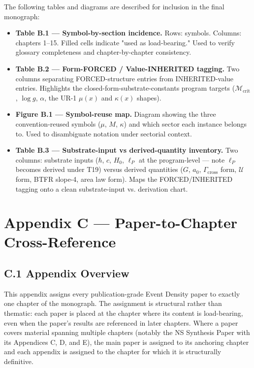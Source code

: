 \documentclass[11pt]{book}
\begin{document}
The following tables and diagrams are described for inclusion in the final monograph:

\begin{itemize}
\item \textbf{Table B.1 — Symbol-by-section incidence.} Rows: symbols. Columns: chapters 1–15. Filled cells indicate "used as load-bearing." Used to verify glossary completeness and chapter-by-chapter consistency.
\item \textbf{Table B.2 — Form-FORCED / Value-INHERITED tagging.} Two columns separating FORCED-structure entries from INHERITED-value entries. Highlights the closed-form-substrate-constants program targets ($\mathcal{M}_\mathrm{crit}$, $\log g$, $\alpha$, the UR-1 $\mu(x)$ and $\kappa(x)$ shapes).
\item \textbf{Figure B.1 — Symbol-reuse map.} Diagram showing the three convention-reused symbols ($\mu$, $M$, $\kappa$) and which sector each instance belongs to. Used to disambiguate notation under sectorial context.
\item \textbf{Table B.3 — Substrate-input vs derived-quantity inventory.} Two columns: substrate inputs ($\hbar$, $c$, $H_0$, $\ell_P$ at the program-level — note $\ell_P$ becomes derived under T19) versus derived quantities ($G$, $a_0$, $\Gamma_\mathrm{cross}$ form, $\mathcal{U}$ form, BTFR slope-4, area law form). Maps the FORCED/INHERITED tagging onto a clean substrate-input vs. derivation chart.
\end{itemize}

\newpage

\chapter{Appendix C --- Paper-to-Chapter Cross-Reference}
\label{app:C}

\section{C.1 Appendix Overview}

This appendix assigns every publication-grade Event Density paper to exactly one chapter of the monograph. The assignment is structural rather than thematic: each paper is placed at the chapter where its content is load-bearing, even when the paper's results are referenced in later chapters. Where a paper covers material spanning multiple chapters (notably the NS Synthesis Paper with its Appendices C, D, and E), the main paper is assigned to its anchoring chapter and each appendix is assigned to the chapter for which it is structurally definitive.
\end{document}
